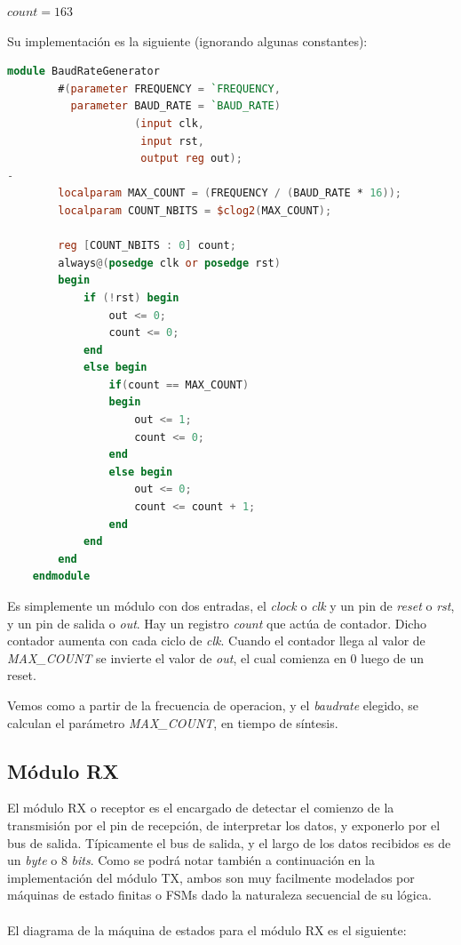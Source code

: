 \documentclass{article}
\begin{document}
\begin{center}
    $ count = 163 $
\end{center}

Su implementación es la siguiente (ignorando algunas constantes):

\begin{lstlisting}[language=Verilog]
    module BaudRateGenerator
        #(parameter FREQUENCY = `FREQUENCY,
          parameter BAUD_RATE = `BAUD_RATE)
                    (input clk, 
                     input rst,
                     output reg out);
-
        localparam MAX_COUNT = (FREQUENCY / (BAUD_RATE * 16));
        localparam COUNT_NBITS = $clog2(MAX_COUNT);

        reg [COUNT_NBITS : 0] count;
        always@(posedge clk or posedge rst)
        begin 
            if (!rst) begin
                out <= 0;
                count <= 0;
            end 
            else begin
                if(count == MAX_COUNT)
                begin
                    out <= 1;
                    count <= 0;
                end
                else begin
                    out <= 0;
                    count <= count + 1;
                end
            end
        end
    endmodule
\end{lstlisting}

Es simplemente un módulo con dos entradas, el \textit{clock} o \textit{clk} y un pin de \textit{reset} o \textit{rst}, y
un pin de salida o \textit{out}.
Hay un registro \textit{count} que actúa de contador. Dicho contador aumenta con cada ciclo de \textit{clk}.
Cuando el contador llega al valor de \textit{MAX\_COUNT} se invierte el valor de \textit{out}, el cual comienza en 0
luego de un reset.

Vemos como a partir de la frecuencia de operacion, y el \textit{baudrate} elegido,
se calculan el parámetro \textit{MAX\_COUNT}, en tiempo de síntesis.

\subsection{Módulo RX}
\indent El módulo RX o receptor es el encargado de detectar el comienzo de la transmisión por el pin de recepción,
de interpretar los datos, y exponerlo por el bus de salida. Típicamente el bus de salida, y el largo de los datos recibidos
es de un \textit{byte} o 8 \textit{bits}.
\indent Como se podrá notar también a continuación en la implementación del módulo TX, ambos son muy facilmente modelados por máquinas de estado finitas o FSMs dado la naturaleza secuencial de su lógica.
\\
\\
El diagrama de la máquina de estados para el módulo RX es el siguiente:
\end{document}
